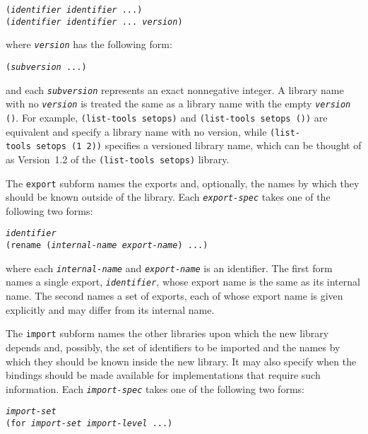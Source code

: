 \begin{alltt}
(\textit{identifier} \textit{identifier} ...)
(\textit{identifier} \textit{identifier} ... \textit{version})
\end{alltt}


\label{libraries_s2}where \texttt{\textit{version}} has the following form:


\texttt{(\textit{subversion} ...)}

and each \texttt{\textit{subversion}} represents an exact nonnegative integer.
A library name with no \texttt{\textit{version}} is treated the same
as a library name with the empty \texttt{\textit{version}} \texttt{()}.
For example, \texttt{(list-tools setops)} and
\texttt{(list-tools setops ())} are equivalent and specify a
library name with no version, while
\texttt{(list-tools setops (1 2))} specifies a versioned library name,
which can be thought of as Version 1.2 of the \texttt{(list-tools setops)}
library.


\label{libraries_s3}The \texttt{export} subform names the exports and, optionally, the names
by which they should be known outside of the library.
Each \texttt{\textit{export-spec}} takes one of the following two forms:


\begin{alltt}
\textit{identifier}
(rename (\textit{internal-name} \textit{export-name}) ...)
\end{alltt}


where each \texttt{\textit{internal-name}} and \texttt{\textit{export-name}} is an identifier.
The first form names a single export, \texttt{\textit{identifier}}, whose export
name is the same as its internal name.
The second names a set of exports, each of whose export name is
given explicitly and may differ from its internal name.


\label{libraries_s4}\label{libraries_s5}\label{libraries_desc_import}The \texttt{import} subform names the other libraries upon which the new
library depends and, possibly, the set of identifiers to be imported and
the names by which they should be known inside the new library.
It may also specify when the bindings should be made available for
implementations that require such information.
Each \texttt{\textit{import-spec}} takes one of the following two forms:


\begin{alltt}
\textit{import-set}
(for \textit{import-set} \textit{import-level} ...)
\end{alltt}


